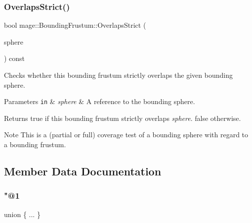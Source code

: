 \subsubsection{\texorpdfstring{Overlaps\+Strict()}{OverlapsStrict()}\hspace{0.1cm}{\footnotesize\ttfamily [2/2]}}
{\footnotesize\ttfamily bool mage\+::\+Bounding\+Frustum\+::\+Overlaps\+Strict (\begin{DoxyParamCaption}\item[{const \hyperlink{classmage_1_1_bounding_sphere}{Bounding\+Sphere} \&}]{sphere }\end{DoxyParamCaption}) const\hspace{0.3cm}{\ttfamily [noexcept]}}

Checks whether this bounding frustum strictly overlaps the given bounding sphere.


\begin{DoxyParams}[1]{Parameters}
\mbox{\tt in}  & {\em sphere} & A reference to the bounding sphere. \\
\hline
\end{DoxyParams}
\begin{DoxyReturn}{Returns}
{\ttfamily true} if this bounding frustum strictly overlaps {\itshape sphere}. {\ttfamily false} otherwise. 
\end{DoxyReturn}
\begin{DoxyNote}{Note}
This is a (partial or full) coverage test of a bounding sphere with regard to a bounding frustum. 
\end{DoxyNote}


\subsection{Member Data Documentation}
\hypertarget{classmage_1_1_bounding_frustum_ae9104e73085b1a9bb6e6918edf92b25f}{}\label{classmage_1_1_bounding_frustum_ae9104e73085b1a9bb6e6918edf92b25f} 
\subsubsection{\texorpdfstring{"@1}{@1}}
{\footnotesize\ttfamily union \{ ... \} \hspace{0.3cm}{\ttfamily [private]}}

\hypertarget{classmage_1_1_bounding_frustum_ae416db4ef5c2fc3eb2e2f25f6e45e747}{}\label{classmage_1_1_bounding_frustum_ae416db4ef5c2fc3eb2e2f25f6e45e747} 
